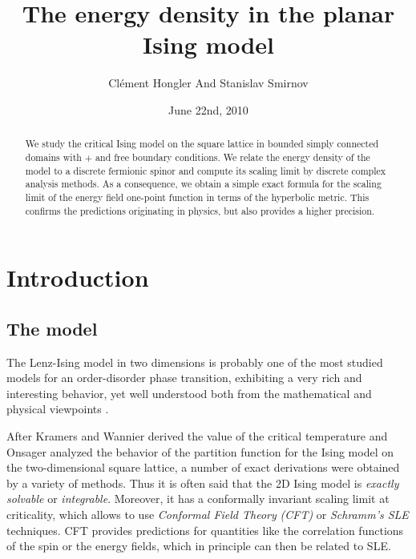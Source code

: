 \documentclass[oneside,english]{amsart}
\numberwithin{equation}{section}
\numberwithin{figure}{section}
\theoremstyle{plain}
\theoremstyle{plain}
\theoremstyle{plain}
\theoremstyle{plain}
\theoremstyle{plain}
\theoremstyle{definition}
\theoremstyle{remark}
\begin{document}
\title{The energy density in the planar Ising model}


\date{June 22nd, 2010}


\author{Clément Hongler And Stanislav Smirnov}


\address{Department of Mathematics, Columbia University. 2990 Broadway, New
York, NY 10027, USA. }




\address{Section de Mathématiques, Université de Genève. 2--4 rue du Lièvre,
Case postale 64, 1211 Genève 4, Suisse. }


\begin{abstract}
We study the critical Ising model on the square lattice in bounded
simply connected domains with $+$ and free boundary conditions. We
relate the energy density of the model to a discrete fermionic spinor
and compute its scaling limit by discrete complex analysis methods.
As a consequence, we obtain a simple exact formula for the scaling
limit of the energy field one-point function in terms of the hyperbolic
metric. This confirms the predictions originating in physics, but
also provides a higher precision.
\end{abstract}


\maketitle
\tableofcontents{}


\section{Introduction}


\subsection{The model}

The Lenz-Ising model in two dimensions is probably one of the most
studied models for an order-disorder phase transition, exhibiting
a very rich and interesting behavior, yet well understood both from
the mathematical and physical viewpoints \cite{baxter,mccoy-wu,palmer}.

After Kramers and Wannier \cite{kramers-wannier} derived the value
of the critical temperature and Onsager \cite{onsager} analyzed the
behavior of the partition function for the Ising model on the two-dimensional
square lattice, a number of exact derivations were obtained by a variety
of methods. Thus it is often said that the 2D Ising model is \emph{exactly
solvable} or \emph{integrable}. Moreover, it has a conformally invariant
scaling limit at criticality, which allows to use \emph{Conformal
Field Theory} \emph{(CFT)} or \emph{Schramm's SLE} techniques. CFT
provides predictions for quantities like the correlation functions
of the spin or the energy fields, which in principle can then be related
to SLE.
\end{document}
